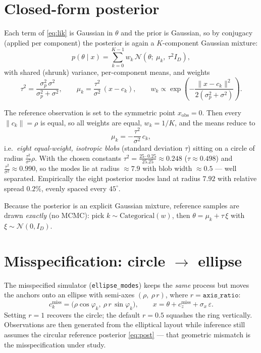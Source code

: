 \documentclass[11pt]{article}
\begin{document}
\section{Closed-form posterior}

Each term of \eqref{eq:lik} is Gaussian in $\theta$ and the prior is Gaussian, so by
conjugacy (applied per component) the posterior is again a $K$-component Gaussian
mixture:
\begin{equation}
  p(\theta \mid x) = \sum_{k=0}^{K-1} w_k\,
      \mathcal{N}\!\left(\theta;\ \mu_k,\ \tau^2 I_D\right),
\end{equation}
with shared (shrunk) variance, per-component means, and weights
\begin{equation}
  \tau^2 = \frac{\sigma_p^2\,\sigma^2}{\sigma_p^2 + \sigma^2}, \qquad
  \mu_k = \frac{\tau^2}{\sigma^2}\,(x - c_k), \qquad
  w_k \propto \exp\!\left(-\frac{\lVert x - c_k\rVert^2}{2(\sigma_p^2 + \sigma^2)}\right).
  \label{eq:post}
\end{equation}

The reference observation is set to the symmetric point $x_{\mathrm{obs}} = 0$. Then
every $\lVert c_k\rVert = \rho$ is equal, so all weights are equal, $w_k = 1/K$, and the
means reduce to
\begin{equation}
  \mu_k = -\frac{\tau^2}{\sigma^2}\,c_k ,
\end{equation}
i.e.\ \emph{eight equal-weight, isotropic blobs} (standard deviation $\tau$) sitting on a
circle of radius $\frac{\tau^2}{\sigma^2}\rho$. With the chosen constants
$\tau^2 = \tfrac{25\cdot0.25}{25.25} \approx 0.248$ ($\tau \approx 0.498$) and
$\frac{\tau^2}{\sigma^2} \approx 0.990$, so the modes lie at radius $\approx 7.9$
with blob width $\approx 0.5$ --- well separated. Empirically the eight posterior modes
land at radius $7.92$ with relative spread $0.2\%$, evenly spaced every $45^\circ$.

Because the posterior is an explicit Gaussian mixture, reference samples are drawn
\emph{exactly} (no MCMC): pick $k \sim \mathrm{Categorical}(w)$, then
$\theta = \mu_k + \tau\,\xi$ with $\xi \sim \mathcal{N}(0, I_D)$.

\section{Misspecification: circle $\to$ ellipse}

The misspecified simulator (\texttt{ellipse\_modes}) keeps the \emph{same} process but
moves the anchors onto an ellipse with semi-axes $(\rho,\ \rho\,r)$, where
$r = \texttt{axis\_ratio}$:
\begin{equation}
  c_k^{\mathrm{miss}} = \big(\rho\cos\varphi_k,\ \rho\,r\,\sin\varphi_k\big), \qquad
  x = \theta + c^{\mathrm{miss}}_{z} + \sigma_x\,\varepsilon .
\end{equation}
Setting $r = 1$ recovers the circle; the default $r = 0.5$ squashes the ring vertically.
Observations are then generated from the elliptical layout while inference still assumes
the circular reference posterior \eqref{eq:post} --- that geometric mismatch is the
misspecification under study.
\end{document}
